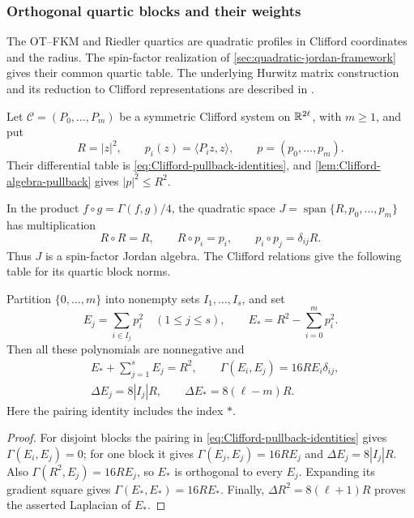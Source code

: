 \subsubsection{Orthogonal quartic blocks and their weights}
\label{sec:Clifford-composition-background}

The OT--FKM and Riedler quartics are quadratic profiles in Clifford
coordinates and the radius. The spin-factor realization of
\cref{sec:quadratic-jordan-framework} gives their common quartic table.
The underlying Hurwitz matrix construction and its reduction to
Clifford representations are described in
\cite[Chapter~0, pp.~2--3; Chapter~1, Lemma~1.5 and Proposition~1.7]{Shapiro2000}.

Let $\mathcal C=(P_0,\ldots,P_m)$ be a symmetric Clifford system on
$\mathbb R^{2\ell}$, with $m\geq1$, and put
\[
 R=|z|^2,\qquad p_i(z)=\langle P_i z,z\rangle,
 \qquad p=(p_0,\ldots,p_m).
\]
Their differential table is \eqref{eq:Clifford-pullback-identities},
and \cref{lem:Clifford-algebra-pullback} gives $|p|^2\leq R^2$.

In the product $f\circ g=\Gamma(f,g)/4$, the quadratic space
$J=\operatorname{span}\{R,p_0,\ldots,p_m\}$ has multiplication
\begin{equation}\label{eq:Clifford-composition-quadratic-table}
 R\circ R=R,\qquad R\circ p_i=p_i,\qquad
 p_i\circ p_j=\delta_{ij}R.
\end{equation}
Thus $J$ is a spin-factor Jordan algebra. The Clifford relations
give the following table for its quartic block norms.

\begin{lemma}
\label{lem:Clifford-block-quartics}
Partition $\{0,\ldots,m\}$ into nonempty sets $I_1,\ldots,I_s$,
and set
\[
 E_j=\sum_{i\in I_j}p_i^2\quad(1\leq j\leq s),\qquad
 E_*=R^2-\sum_{i=0}^m p_i^2.
\]
Then all these polynomials are nonnegative and
\begin{align}
 &E_*+\sum_{j=1}^s E_j=R^2,\qquad
 \Gamma(E_i,E_j)=16RE_i\delta_{ij},
 \label{eq:Clifford-composition-quartic-table}\\
 &\Delta E_j=8|I_j|R,\qquad
 \Delta E_*=8(\ell-m)R.\nonumber
\end{align}
Here the pairing identity includes the index $*$.
\end{lemma}

\begin{proof}
For disjoint blocks the pairing in
\eqref{eq:Clifford-pullback-identities} gives
$\Gamma(E_i,E_j)=0$; for one block it gives
$\Gamma(E_j,E_j)=16RE_j$ and $\Delta E_j=8|I_j|R$.
Also $\Gamma(R^2,E_j)=16RE_j$, so $E_*$ is orthogonal to every
$E_j$.  Expanding its gradient square gives
$\Gamma(E_*,E_*)=16RE_*$.  Finally,
$\Delta R^2=8(\ell+1)R$ proves the asserted Laplacian of $E_*$.
\end{proof}

